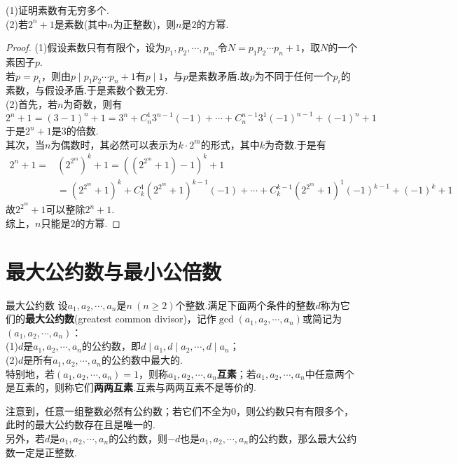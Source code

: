 \documentclass[lang=cn, zihao=5]{elegantbook}
\newcommand{\ssb}[1]{\left( #1 \right)}
\begin{document}
\begin{example} %
	(1)证明素数有无穷多个. \\
	(2)若$2^n+1$是素数(其中$n$为正整数)，则$n$是$2$的方幂.
\end{example}
\begin{proof}
	(1)假设素数只有有限个，设为$p_1,p_2, \cdots ,p_m$.令$N=p_1p_2 \cdots p_n + 1$，取$N$的一个素因子$p$.\\
	若$p=p_i$，则由$p \mid p_1p_2\cdots p_n +1$有$p \mid 1$，与$p$是素数矛盾.故$p$为不同于任何一个$p_i$的素数，与假设矛盾.于是素数个数无穷. \\
	(2)首先，若$n$为奇数，则有$$2^n+1 = (3-1)^n+1 = 3^n + C_n^1 3^{n-1}(-1) + \cdots +C_n^{n-1} 3^1 (-1)^{n-1} + (-1)^n + 1$$
	于是$2^n+1$是$3$的倍数. \\
	其次，当$n$为偶数时，其必然可以表示为$k \cdot 2^m$的形式，其中$k$为奇数.于是有
	\begin{align*}
		2^n+1 = &\left( 2^{2^m} \right)^k + 1 = \ssb{ (2^{2^m}+1)-1 }^k + 1 \\
		&= (2^{2^m}+1)^k + C_k^1 (2^{2^m}+1)^{k-1}(-1) + \cdots + C_k^{k-1}(2^{2^m}+1)^1(-1)^{k-1} + (-1)^k + 1
	\end{align*}
	故$2^{2^m}+1$可以整除$2^n+1$. \\
	综上，$n$只能是$2$的方幂.
\end{proof}

\section{最大公约数与最小公倍数}

\begin{definition}{最大公约数}
	设$a_1,a_2, \cdots ,a_n$是$n~(n \geq 2)$个整数.满足下面两个条件的整数$d$称为它们的\textbf{最大公约数}(greatest common divisor)，记作$\gcd (a_1,a_2, \cdots ,a_n)$或简记为$(a_1,a_2, \cdots ,a_n)$： \\
	(1)$d$是$a_1,a_2, \cdots ,a_n$的公约数，即$d \mid a_1,d \mid a_2, \cdots ,d \mid a_n$； \\
	(2)$d$是所有$a_1,a_2, \cdots ,a_n$的公约数中最大的. \\
	特别地，若$(a_1,a_2, \cdots ,a_n)=1$，则称$a_1,a_2, \cdots ,a_n$\textbf{互素}；若$a_1,a_2, \cdots ,a_n$中任意两个是互素的，则称它们\textbf{两两互素}.互素与两两互素不是等价的.
\end{definition}
\begin{remark}
	注意到，任意一组整数必然有公约数；若它们不全为$0$，则公约数只有有限多个，此时的最大公约数存在且是唯一的.\\ 
	另外，若$d$是$a_1,a_2, \cdots ,a_n$的公约数，则$-d$也是$a_1,a_2, \cdots ,a_n$的公约数，那么最大公约数一定是正整数.
\end{remark}
\end{document}
